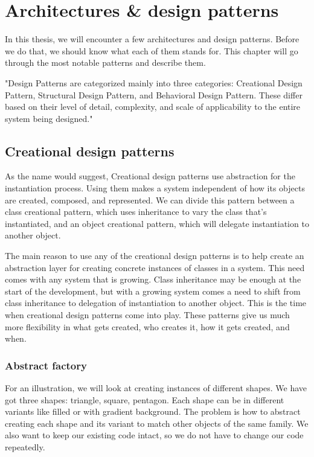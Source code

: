 \chapter{Architectures \& design patterns}

In this thesis, we will encounter a few architectures and design patterns. Before we do that, we should know what each of
them stands for. This chapter will go through the most notable patterns and describe them.

"Design Patterns are categorized mainly into three categories: Creational Design Pattern, Structural Design Pattern, and Behavioral
Design Pattern. These differ based on their level of detail, complexity, and scale of applicability to the entire system being designed." \cite{noauthor_classification_nodate}

\section{Creational design patterns}

As the name would suggest, Creational design patterns use abstraction for the instantiation process.
Using them makes a system independent of how its objects are created, composed, and represented. We can divide this pattern between
a class creational pattern, which uses inheritance to vary the class that's instantiated, and an object creational pattern, which will
delegate instantiation to another object. \cite{gamma_design_1995}

The main reason to use any of the creational design patterns is to help create an
abstraction layer for creating concrete instances of classes in a system.
This need comes with any system that is growing. Class inheritance may be enough at the start of the development,
but with a growing system comes a need to shift from class inheritance to delegation of instantiation to another object.
This is the time when creational design patterns come into play. These patterns give us much more flexibility
in what gets created, who creates it, how it gets created, and when.

\subsection{Abstract factory}

For an illustration, we will look at creating instances of different shapes.
We have got three shapes: triangle, square, pentagon. Each shape can be in different
variants like filled or with gradient background. The problem is how to abstract creating
each shape and its variant to match other objects of the same family. We also want to keep our
existing code intact, so we do not have to change our code repeatedly. \cite{gamma_design_1995}

